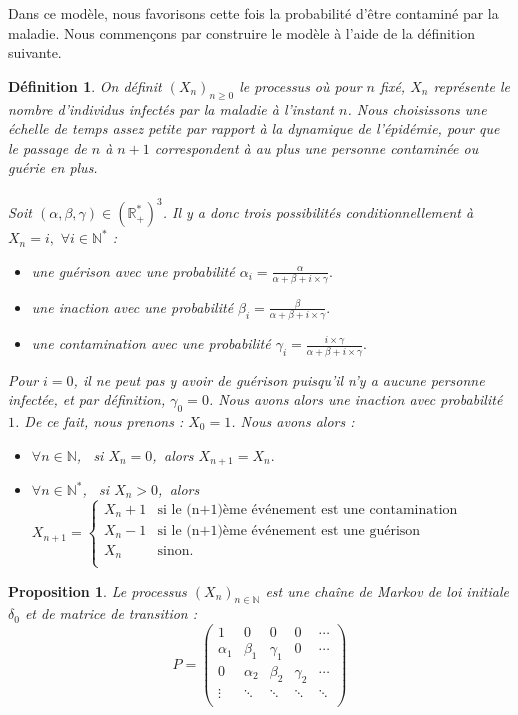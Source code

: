 \documentclass[12pt,a4paper]{report}
\newtheorem{definition}{Définition}[section]
\newtheorem{prop}[thm]{Proposition}
\theoremstyle{remark}
\begin{document}
Dans ce modèle, nous favorisons cette fois la probabilité d'être contaminé par la maladie. Nous commençons par construire le modèle à l'aide de la définition suivante.
\\
\begin{definition}
On définit $(X_n)_{n\geq0}$ le processus où pour $n$ fixé, $X_n$  représente le nombre d'individus infectés par la maladie à l'instant $n$. Nous choisissons une échelle de temps assez petite par rapport à la dynamique de l'épidémie, pour que le passage de $n$ à $n+1$ correspondent à au plus une personne contaminée ou guérie en plus.
\\
\\
Soit $(\alpha, \beta, \gamma) \in (\mathbb{R}_+^*)^3$. Il y a donc trois possibilités conditionnellement à $X_n = i, \, \, \forall i \in \mathbb{N}^*$ :  
\\
\begin{itemize}
\item une guérison avec une probabilité $\alpha_i=\frac{\alpha}{\alpha+\beta+i \times \gamma}.$
\item une inaction avec une probabilité $\beta_i=\frac{\beta}{\alpha+\beta+i \times \gamma}.$
\item une contamination avec une probabilité $\gamma_i=\frac{i \times \gamma}{\alpha+\beta+i \times \gamma}.$
\end{itemize}
\vspace{0.5cm}
Pour $i=0$, il ne peut pas y avoir de guérison puisqu'il n'y a aucune personne infectée, et par définition, $\gamma_0 = 0$. Nous avons alors une inaction avec probabilité $1$. De ce fait, nous prenons : $X_0 = 1$. Nous avons alors :
\\
\begin{itemize}
\item $\forall n \in \mathbb{N}$, \, si $X_n=0$,\, alors $X_{n+1} = X_n.$
\item $\forall n \in \mathbb{N}^*$, \, si $X_n > 0$,\, alors $X_{n+1} = \left\{
    \begin{array}{ll}
        X_n+1 & \mbox{si le (n+1)ème événement est une contamination} \\
        X_n-1 & \mbox{si le (n+1)ème événement est une guérison} \\
        X_n & \mbox{sinon. }\\
    \end{array}
\right. $
\end{itemize}
\end{definition}
\begin{prop}
Le processus $(X_n)_{n \in \mathbb{N}}$ est une chaîne de Markov de loi initiale $\delta_0$ et de matrice de transition :
$$P=
\begin{pmatrix}
        1 & 0 & 0 & 0 & \cdots \\
         \alpha_1 & \beta_1 & \gamma_1 & 0 & \cdots\\
         0 & \alpha_2 & \beta_2 & \gamma_2 & \cdots\\
        \vdots &\ddots & \ddots & \ddots & \ddots \\
\end{pmatrix}$$
\end{prop}
\end{document}
